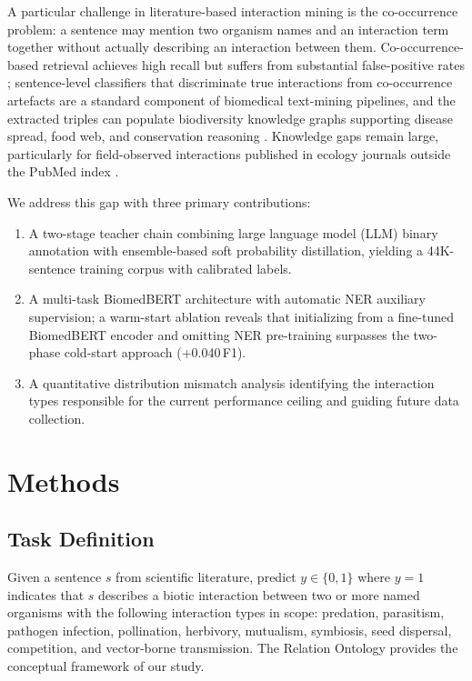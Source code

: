 \documentclass[11pt,twocolumn]{article}
\begin{document}
A particular challenge in literature-based interaction mining is the
co-occurrence problem: a sentence may mention two organism names and an
interaction term together without actually describing an interaction between
them. Co-occurrence-based retrieval achieves high recall but suffers from
substantial false-positive rates \citep{bunescu2005comparative};
sentence-level classifiers that discriminate true interactions from
co-occurrence artefacts are a standard component of biomedical
text-mining pipelines, and the extracted triples can populate biodiversity
knowledge graphs supporting disease spread, food web, and conservation
reasoning \citep{page2016biodiversity, poisot2021global}. Knowledge gaps
remain large, particularly for field-observed interactions published in
ecology journals outside the PubMed index \citep{poisot2021global}.

We address this gap with three primary contributions:
\begin{enumerate}
    \item A two-stage teacher chain combining large language model (LLM)
    binary annotation with ensemble-based soft probability distillation, yielding a
    44K-sentence training corpus with calibrated labels.
    \item A multi-task BiomedBERT architecture with automatic NER auxiliary
    supervision; a warm-start ablation reveals that initializing from a
    fine-tuned BiomedBERT encoder and omitting NER pre-training surpasses
    the two-phase cold-start approach (+0.040\,F1).
    \item A quantitative distribution mismatch analysis identifying the
    interaction types responsible for the current performance ceiling and
    guiding future data collection.
\end{enumerate}

\section{Methods}
\label{sec:methods}

\subsection{Task Definition}

Given a sentence $s$ from scientific literature, predict $y \in \{0, 1\}$
where $y=1$ indicates that $s$ describes a biotic interaction between two
or more named organisms with the following interaction types in scope: predation, parasitism,
pathogen infection, pollination, herbivory, mutualism, symbiosis, seed
dispersal, competition, and vector-borne transmission. 
The Relation Ontology provides the conceptual framework of our study.
\end{document}
